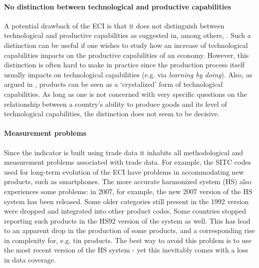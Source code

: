 \documentclass[abstract=on]{scrartcl}
\begin{document}
\paragraph{No distinction between technological and productive capabilities}
A potential drawback of the ECI is that it does not distinguish between technological and productive capabilities as suggested in, among others, \citet[p. 919]{Archibugi:2009bf}. 
Such a distinction can be useful if one wishes to study how an increase of technological capabilities impacts on the productive capabilities of an economy. 
However, this distinction is often hard to make in practice since the production process itself usually impacts on technological capabilities (e.g. via \textit{learning by doing}).
Also, as argued in \citet{Hidalgo:2015vs}, products can be seen as a `crystalized' form of technological capabilities.
As long as one is not concerned with very specific questions on the relationship between a country's ability to produce goods and its level of technological capabilities, the distinction does not seem to be decisive.


\paragraph{Measurement problems}
Since the indicator is built using trade data it inhabits all methodological and measurement problems associated with trade data. 
For example, the SITC codes used for long-term evolution of the ECI have problems in accommodating new products, such as smartphones.
The more accurate harmonized system (HS) also experiences some problems: in 2007, for example, the new 2007 version of the HS system has been released. 
Some older categories still present in the 1992 version were dropped and integrated into other product codes.
Some countries stopped reporting such products in the HS92 version of the system as well.
This has lead to an apparent drop in the production of some products, and a corresponding rise in complexity for, e.g. tin products.
The best way to avoid this problem is to use the most recent version of the HS system - yet this inevitably comes with a loss in data coverage.
\end{document}
